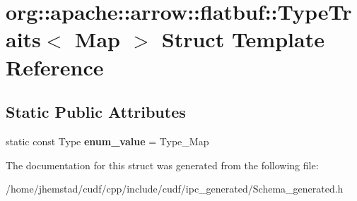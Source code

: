 \hypertarget{structorg_1_1apache_1_1arrow_1_1flatbuf_1_1TypeTraits_3_01Map_01_4}{}\section{org\+:\+:apache\+:\+:arrow\+:\+:flatbuf\+:\+:Type\+Traits$<$ Map $>$ Struct Template Reference}
\label{structorg_1_1apache_1_1arrow_1_1flatbuf_1_1TypeTraits_3_01Map_01_4}
\subsection*{Static Public Attributes}
\begin{DoxyCompactItemize}
\item 
static const Type {\bfseries enum\+\_\+value} = Type\+\_\+\+Map\hypertarget{structorg_1_1apache_1_1arrow_1_1flatbuf_1_1TypeTraits_3_01Map_01_4_a043ff7ec37f2713b4596a63fbfef59b8}{}\label{structorg_1_1apache_1_1arrow_1_1flatbuf_1_1TypeTraits_3_01Map_01_4_a043ff7ec37f2713b4596a63fbfef59b8}

\end{DoxyCompactItemize}


The documentation for this struct was generated from the following file\+:\begin{DoxyCompactItemize}
\item 
/home/jhemstad/cudf/cpp/include/cudf/ipc\+\_\+generated/Schema\+\_\+generated.\+h\end{DoxyCompactItemize}
